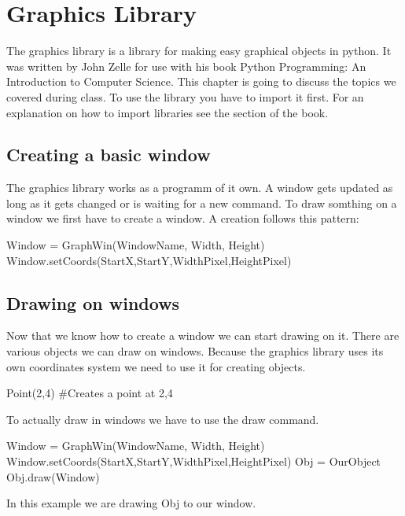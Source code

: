 \chapter{Graphics Library}

The graphics library is a library for making easy graphical objects in python. It was written by John Zelle for use with his book Python Programming: An
Introduction to Computer Science. This chapter is going to discuss the topics we covered during class. To use the library you have to import it first. For an explanation on how to import libraries see the section of the book.

\section{Creating a basic window}
The graphics library works as a programm of it own. A window gets updated as long as it gets changed or is waiting for a new command.
To draw somthing on a window we first have to create a window. A creation follows this pattern:
\begin{fullwidth}
\begin{python}
Window = GraphWin(WindowName, Width, Height)
Window.setCoords(StartX,StartY,WidthPixel,HeightPixel)
\end{python}
\end{fullwidth}

\section{Drawing on windows}
Now that we know how to create a window we can start drawing on it. There are various objects we can draw on windows. Because the graphics library uses its own coordinates system we need to use it for creating objects.
\begin{python}
Point(2,4) #Creates a point at 2,4
\end{python}
To actually draw in windows we have to use the draw command. 
\begin{fullwidth}
\begin{python}
Window = GraphWin(WindowName, Width, Height)
Window.setCoords(StartX,StartY,WidthPixel,HeightPixel)
Obj = OurObject
Obj.draw(Window)
\end{python}
\end{fullwidth}

In this example we are drawing Obj to our window.

